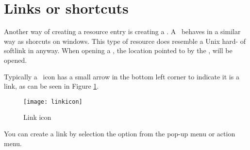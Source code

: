 \section{Links or shortcuts}
\label{section:links} 

 Another way of creating a resource entry is creating a \link. A \link\ behaves in
 a similar way as shorcuts on windows. This type of resource does  
 resemble a Unix hard- of softlink in anyway. When opening a \link, the location 
 pointed to by the \link, will be opened. 
 
 Typically a \link\ icon has a small arrow in the bottom left corner
 to indicate it is a link, as can be seen in Figure \ref{fig:linkicon}.

 \begin{figure}[htbp]
  \centerline{\texttt{[image: linkicon]}}
  \caption{Link icon}
  \label{fig:linkicon}
 \end{figure}

 You can create a link by selection the  option from 
 the pop-up menu or action menu.